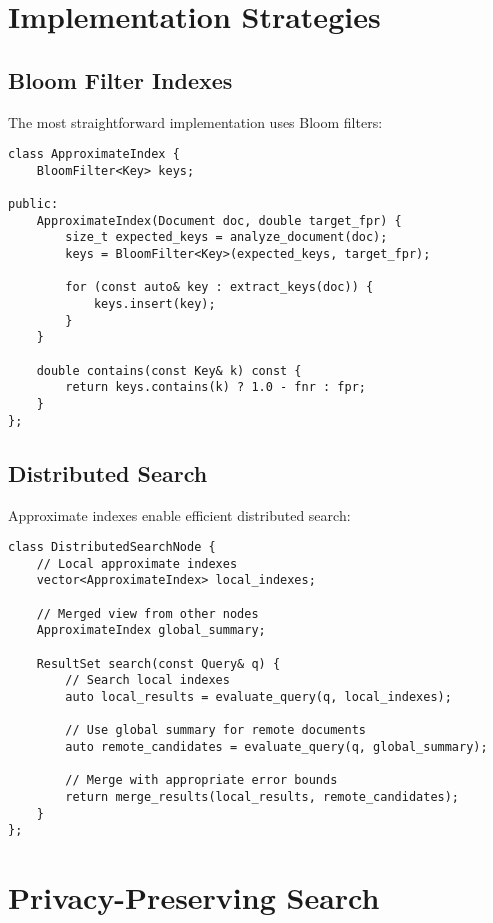 \documentclass[11pt,final,hidelinks]{article}
\begin{document}
\section{Implementation Strategies}

\subsection{Bloom Filter Indexes}

The most straightforward implementation uses Bloom filters:

\begin{verbatim}
class ApproximateIndex {
    BloomFilter<Key> keys;
    
public:
    ApproximateIndex(Document doc, double target_fpr) {
        size_t expected_keys = analyze_document(doc);
        keys = BloomFilter<Key>(expected_keys, target_fpr);
        
        for (const auto& key : extract_keys(doc)) {
            keys.insert(key);
        }
    }
    
    double contains(const Key& k) const {
        return keys.contains(k) ? 1.0 - fnr : fpr;
    }
};
\end{verbatim}

\subsection{Distributed Search}

Approximate indexes enable efficient distributed search:

\begin{verbatim}
class DistributedSearchNode {
    // Local approximate indexes
    vector<ApproximateIndex> local_indexes;
    
    // Merged view from other nodes
    ApproximateIndex global_summary;
    
    ResultSet search(const Query& q) {
        // Search local indexes
        auto local_results = evaluate_query(q, local_indexes);
        
        // Use global summary for remote documents
        auto remote_candidates = evaluate_query(q, global_summary);
        
        // Merge with appropriate error bounds
        return merge_results(local_results, remote_candidates);
    }
};
\end{verbatim}

\section{Privacy-Preserving Search}
\end{document}
